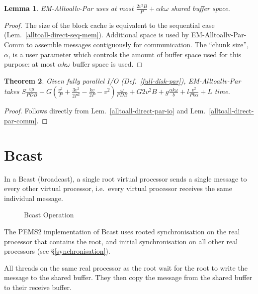 \documentclass[12pt]{carletoncsthesis}
\newtheorem{thm}{Theorem}[section]
\newtheorem{lemma}[thm]{Lemma}
\begin{document}
\begin{lemma}
\label{alltoall-direct-par-mem}
{\sc EM-Alltoallv-Par} uses at most $\frac{2v^2B}{P} + \alpha{k}\omega$ shared buffer space.
\end{lemma}
\begin{proof}
The size of the block cache is equivalent to the sequential case
(Lem.~\ref{alltoall-direct-seq-mem}).  Additional space is used by {\sc
EM-Alltoallv-Par-Comm} to assemble messages contiguously for communication.
The ``chunk size'', $\alpha$, is a user parameter which controls the amount
of buffer space used for this purpose: at most $\alpha{k}\omega$ buffer
space is used.
\end{proof}

\begin{thm}
\label{alltoall-direct-par-time}
Given fully parallel I/O (Def.~\ref{full-disk-par}), {\sc EM-Alltoallv-Par}
takes $
S\frac{v\mu}{PDB}
	+ G\left( \frac{v^2}{P}
	        + \frac{3v^2}{2P^2}
	        - \frac{kv}{2P}
			- v^2
	  \right) \frac{\omega}{PDB}
	+ G2v^2B
	+ g\frac{\alpha{k}\omega}{b} + l\frac{v^2}{Pk\alpha} + L$ time.
\end{thm}
\begin{proof}
Follows directly from Lem.~\ref{alltoall-direct-par-io} and
Lem.~\ref{alltoall-direct-par-comm}.
\end{proof}

\clearpage
\section{Bcast}
\label{bcast-sec}


In a {\sc Bcast} (broadcast), a single root virtual processor sends a single
message to every other virtual processor, i.e.\ every virtual processor
receives the same individual message.

\begin{figure}[ht]
\begin{center}
\caption{Bcast Operation}
\end{center}
\end{figure}

The PEMS2 implementation of Bcast uses rooted synchronisation on the real
processor that contains the root, and initial synchronisation on all other
real processors (see \S\ref{synchronisation}).

All threads on the same real processor as the root wait for the root to
write the message to the shared buffer.  They then copy the message from the shared
buffer to their receive buffer.
\end{document}
